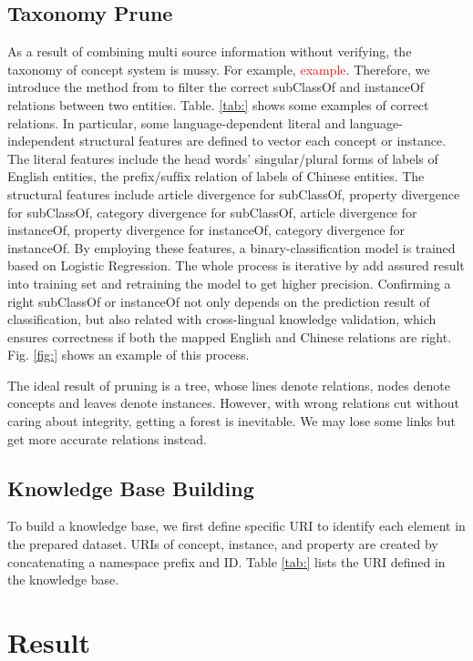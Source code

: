 \documentclass[runningheads,a4paper]{llncs}
\begin{document}
\subsection{Taxonomy Prune}
\label{sec:tp}
As a result of combining multi source information without verifying, the taxonomy of concept system is mussy. For example, \textcolor{red}{example}. Therefore, we introduce the method from\cite{wang2014cross} to filter the correct subClassOf and instanceOf relations between two entities. Table. \ref{tab:} shows some examples of correct relations. In particular, some language-dependent literal and language-independent structural features are defined to vector each concept or instance. The literal features include the head words’ singular/plural forms of labels of English entities, the preﬁx/sufﬁx relation of labels of Chinese entities. The structural features include article divergence for subClassOf, property divergence for subClassOf, category divergence for subClassOf, article divergence for instanceOf, property divergence for instanceOf, category divergence for instanceOf. By employing these features, a binary-classification model is trained based on Logistic Regression. The whole process is iterative by add assured result into training set and retraining the model to get higher precision. Confirming a right subClassOf or instanceOf not only depends on the prediction result of classification, but also related with cross-lingual knowledge validation, which ensures correctness if both the mapped English and Chinese relations are right. Fig. \ref{fig:} shows an example of this process.

The ideal result of pruning is a tree, whose lines denote relations, nodes denote concepts and leaves denote instances. However, with wrong relations cut without caring about integrity, getting a forest is inevitable. We may lose some links but get more accurate relations instead.

\subsection{Knowledge Base Building}
To build a knowledge base, we first define specific URI to identify each element in the prepared dataset. URIs of concept, instance, and property are created by concatenating a namespace prefix and ID. Table \ref{tab:} lists the URI defined in the knowledge base.

\section{Result}
\label{sec:result}
\end{document}
